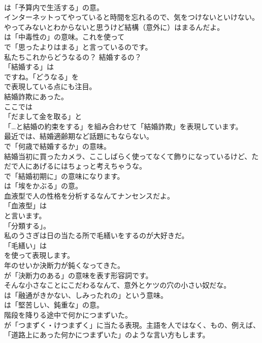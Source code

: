 \documentclass[8pt]{extreport}
\begin{document}
\begin{CJK}{UTF8}{min}
\\	は「予算内で生活する」の意。	
\\	インターネットってやっていると時間を忘れるので、気をつけないといけない。やってみないとわからないと思うけど結構（意外に）はまるんだよ。 
\\	は「中毒性の」の意味。これを使って
\\	で「思ったよりはまる」と言っているのです。	
\\	私たちこれからどうなるの？ 結婚するの？ 
\\	「結婚する」は 
\\	ですね。「どうなる」を 
\\	で表現している点にも注目。	
\\	結婚詐欺にあった。 
\\	ここでは
\\	「だまして金を取る」と
\\	「…と結婚の約束をする」を組み合わせて「結婚詐欺」を表現しています。	
\\	最近では、結婚適齢期など話題にもならない。 
\\	で「何歳で結婚するか」の意味。	
\\	結婚当初に買ったカメラ、ここしばらく使ってなくて飾りになっているけど、ただで人にあげるにはちょっと考えちゃうな。 
\\	で「結婚初期に」の意味になります。
\\	は「埃をかぶる」の意。	
\\	血液型で人の性格を分析するなんてナンセンスだよ。 
\\	「血液型」は
\\	と言います。
\\	「分類する」。	
\\	私のうさぎは日の当たる所で毛繕いをするのが大好きだ。 
\\	「毛繕い」は
\\	を使って表現します。	
\\	年のせいか決断力が鈍くなってきた。 
\\	が「決断力のある」の意味を表す形容詞です。	
\\	そんな小さなことにこだわるなんて、意外とケツの穴の小さい奴だな。 
\\	は「融通がきかない、しみったれの」という意味。
\\	は「堅苦しい、鈍重な」の意。	
\\	階段を降りる途中で何かにつまずいた。 
\\	が「つまずく・けつまずく」に当たる表現。主語を人ではなく、もの、例えば、
\\	「道路上にあった何かにつまずいた」のような言い方もします。	

\end{CJK}
\end{document}
